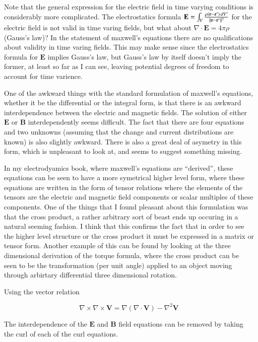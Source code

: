 \documentclass{article}      %
\newcommand{\norm}[1]{\lVert#1\rVert}
\newcommand{\grad}[1]{\nabla#1}
\newcommand{\curl}[1]{\nabla \times #1}
\newcommand{\Curl}[1]{\nabla \times \mathbf{#1}}
\newcommand{\diverg}[1]{\nabla \cdot #1}
\newcommand{\Diverg}[1]{\nabla \cdot \mathbf{#1}}
\newcommand{\curlCurl}[1]{\curl\Curl{#1}}
\newcommand{\Delsquared}[1]{{\nabla^2}{\mathbf{#1}}}
\newcommand{\BB}[0]{\mathbf{B}}
\newcommand{\BE}[0]{\mathbf{E}}
\begin{document}
Note that the general expression for the 
electric field in time varying conditions is considerably more complicated.
The electrostatics formula 
$\BE = \int_V{{\rho (\mathbf{r - r'})\,dV'} \over {\norm{\mathbf r - \mathbf r'}^3}}$
for the electric field is not valid in time 
varing fields, but what 
about $\diverg{\BE} = 4\pi\rho$ (Gauss's law)?  In the statement of maxwell's equations
there are no qualifications about validity in time varing fields.  This may
make sense since the electrostatics formula for $\BE$ implies Gauss's law, 
but Gauss's law by itself doesn't imply the former, at least so far as I can
see, leaving potential 
degrees of freedom to account for time varience.

One of the awkward things with the standard formulation of 
maxwell's equations, whether it be the 
differential or the integral form, is that there 
is an awkward interdependence between the electric and magnetic fields. 
The solution of either $\BE$ or $\BB$ interdependently seems difficult.  The 
fact that there are four equations and two unknowns (assuming that the 
change and current distributions are known) is also slightly awkward.
There is also a great deal of asymetry in this form, which is unpleasant
to look at, and seems to suggest something missing.

In my electrodyamics book, where maxwell's equations are ``derived'',
these equations can be seen to have a more symetrical higher level form, where
these equations are written in the form of tensor relations where
the elements of the tensors are the electric and magnetic field components 
or scalar multiples of these components.  One of the things that I found 
pleasant about this formulation was that the cross product, a rather 
arbitrary sort of beast ends up occuring in a natural seeming fashion.  I 
think that this confirms the fact that in order to see the higher level 
structure or the cross product it must be expressed in a matrix or tensor form.
Another example of this can be found by looking at the three dimensional 
derivation of the torque formula, where the 
cross product can be seen to be the transformation (per unit angle)
applied to an object moving through arbirtary differential three dimensional 
rotation.

Using the vector relation

\begin{equation*}
\curlCurl{V} = \grad (\Diverg V) - \Delsquared{V}
\end{equation*}

The interdependence of the $\BE$ and $\BB$ field equations can be removed by taking the
curl of each of the curl equations.
\end{document}
